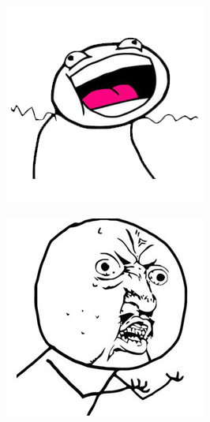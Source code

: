 \begin{multicols}{8}
\begin{center}
\includegraphics[width=\linewidth]{./IMG-GIT/MEMES/Meme-Faces-37.jpg}  
\end{center}

\begin{center}
\includegraphics[width=\linewidth]{./IMG-GIT/MEMES/Meme-Faces-45.jpg}  
\end{center}


\end{multicols}
